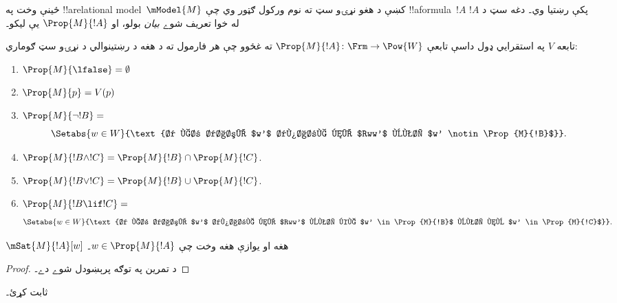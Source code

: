 \documentclass[../../../include/open-logic-section]{subfiles}
\begin{document}


ځينې وخت په !!a{relational model}~$\mModel{M}$ کښې د هغو نړۍو سټ ته نوم ورکول ګټور وي چې !!a{formula}~$!A$ پکې رښتيا وي۔ دغه سټ د $!A$ له خوا تعريف شوے \emph{بيان} بولو، او $\Prop{M}{!A}$ يې ليکو۔

\begin{defn}
تابعه $V$ په استقرايي ډول داسې تابعې $\Prop{M}{!A} \colon \Frm
  \to \Pow{W}$ ته غځوو چې هر فارمول ته د هغه د رښتينوالي د نړۍو سټ ګوماري:
  \begin{enumerate}
  \item $\Prop{M}{\lfalse} = \emptyset$
  \item $\Prop{M}{p} = V(p)$
  \item $\Prop{M}{\lnot !B} = {}$
    \[
      \Setabs{w \in W}{\text{د هر داسې $w'$ دپاره چې $Rww'$ وي، $w'
          \notin \Prop{M}{!B}$}}.
    \]
  \item $\Prop{M}{!B \land !C} = \Prop{M}{!B} \cap \Prop{M}{!C}$.
  \item $\Prop{M}{!B \lor !C} = \Prop{M}{!B} \cup \Prop{M}{!C}$.
  \item $\Prop{M}{!B \lif !C} = {}$
    \[
      \Setabs{w \in W}{\text{د هر داسې $w'$ دپاره چې $Rww'$ وي، که $w'
          \in \Prop{M}{!B}$ وي، نو $w' \in \Prop{M}{!C}$}}.
    \]
  \end{enumerate}
\end{defn}

\begin{prop}
  $\mSat{M}{!A}[w]$ هغه او يوازې هغه وخت چې $w \in \Prop{M}{!A}$۔
\end{prop}

\begin{proof}
  د تمرين په توګه پرېښودل شوے دے۔
\end{proof}

\begin{prob}
   ثابت کړئ۔
\end{prob}
\end{document}
